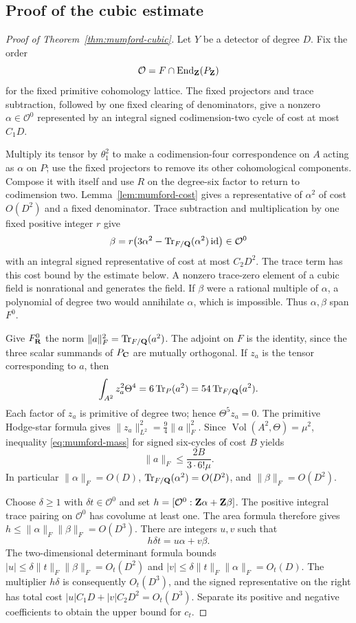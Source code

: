 \subsection{Proof of the cubic estimate}

\begin{proof}[Proof of Theorem~\ref{thm:mumford-cubic}]
Let $Y$ be a detector of degree $D$. Fix the order
\[
 \mathcal O=F\cap\operatorname{End}_{\mathbf Z}(P_{\mathbf Z})
\]
for the fixed primitive cohomology lattice. The fixed projectors and
trace subtraction, followed by one fixed clearing of denominators,
give a nonzero $\alpha\in\mathcal O^0$ represented by an integral
signed codimension-two cycle of cost at most $C_1D$.

Multiply its tensor by $\theta_1^2$ to make a codimension-four
correspondence on $A$ acting as $\alpha$ on $P$; use the fixed
projectors to remove its other cohomological components.
Compose it with itself and use $R$ on the degree-six factor to
return to codimension two. Lemma~\ref{lem:mumford-cost} gives a
representative of $\alpha^2$ of cost $O(D^2)$ and a fixed
denominator. Trace subtraction and multiplication by one fixed
positive integer $r$ give
\[
 \beta=r\bigl(3\alpha^2-
        \operatorname{Tr}_{F/\mathbf Q}(\alpha^2)\operatorname{id}\bigr)
      \in\mathcal O^0
\]
with an integral signed representative of cost at most $C_2D^2$.
The trace term has this cost bound by the estimate below.
A nonzero trace-zero element of a cubic field is nonrational and
generates the field. If $\beta$ were a rational multiple of $\alpha$,
a polynomial of degree two would annihilate $\alpha$, which is
impossible. Thus $\alpha,\beta$ span $F^0$.

Give $F^0_{\mathbf R}$ the norm
$\|a\|_F^2=\operatorname{Tr}_{F/\mathbf Q}(a^2)$.
The adjoint on $F$ is the identity, since the three scalar summands
of $P_\mathbf C$ are mutually orthogonal. If $z_a$ is the tensor
corresponding to $a$, then
\[
 \int_{A^2}z_a^2\Theta^4
   =6\operatorname{Tr}_{P}(a^2)
   =54\operatorname{Tr}_{F/\mathbf Q}(a^2).
\]
Each factor of $z_a$ is primitive of degree two; hence
$\Theta^5z_a=0$. The primitive Hodge-star formula gives
$\|z_a\|_{L^2}^2=\frac94\|a\|_F^2$.
Since $\operatorname{Vol}(A^2,\Theta)=\mu^2$, inequality
\eqref{eq:mumford-mass} for signed six-cycles of cost $B$ yields
\[
 \|a\|_F\leq\frac{2B}{3\cdot6!\mu}.
\]
In particular $\|\alpha\|_F=O(D)$,
$\operatorname{Tr}_{F/\mathbf Q}(\alpha^2)=O(D^2)$, and
$\|\beta\|_F=O(D^2)$.

Choose $\delta\geq1$ with $\delta t\in\mathcal O^0$ and set
$h=[\mathcal O^0:\mathbf Z\alpha+\mathbf Z\beta]$.
The positive integral trace pairing on $\mathcal O^0$ has
covolume at least one. The area formula therefore gives
$h\leq\|\alpha\|_F\|\beta\|_F=O(D^3)$.
There are integers $u,v$ such that
\[
 h\delta t=u\alpha+v\beta.
\]
The two-dimensional determinant formula bounds
$|u|\leq\delta\|t\|_F\|\beta\|_F=O_t(D^2)$ and
$|v|\leq\delta\|t\|_F\|\alpha\|_F=O_t(D)$.
The multiplier $h\delta$ is consequently $O_t(D^3)$, and the
signed representative on the right has total cost
$|u|C_1D+|v|C_2D^2=O_t(D^3)$.
Separate its positive and negative coefficients to obtain the
upper bound for $c_t$.


\end{proof}
